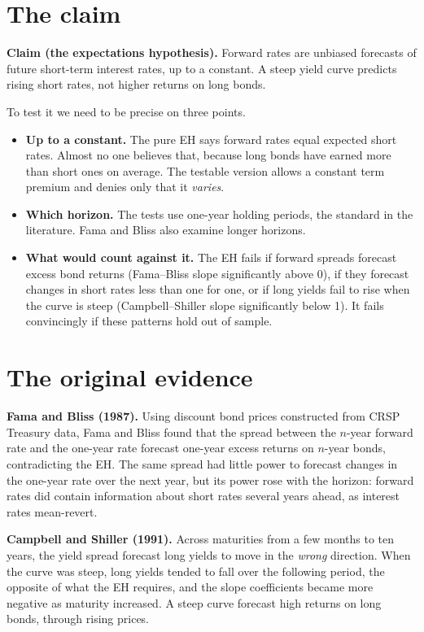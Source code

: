 \section{The claim}
\label{sec:16-claim}

\begin{callout}
\textbf{Claim (the expectations hypothesis).} Forward rates are unbiased forecasts of future short-term interest rates, up to a constant. A steep yield curve predicts rising short rates, not higher returns on long bonds.
\end{callout}

To test it we need to be precise on three points.

\begin{itemize}
  \item \textbf{Up to a constant.} The pure EH says forward rates equal expected short rates. Almost no one believes that, because long bonds have earned more than short ones on average. The testable version allows a constant term premium and denies only that it \emph{varies}.
  \item \textbf{Which horizon.} The tests use one-year holding periods, the standard in the literature. Fama and Bliss also examine longer horizons.
  \item \textbf{What would count against it.} The EH fails if forward spreads forecast excess bond returns (Fama--Bliss slope significantly above 0), if they forecast changes in short rates less than one for one, or if long yields fail to rise when the curve is steep (Campbell--Shiller slope significantly below 1). It fails convincingly if these patterns hold out of sample.
\end{itemize}

\section{The original evidence}
\label{sec:16-evidence}

\textbf{Fama and Bliss (1987).} Using discount bond prices constructed from CRSP Treasury data, Fama and Bliss found that the spread between the $n$-year forward rate and the one-year rate forecast one-year excess returns on $n$-year bonds, contradicting the EH. The same spread had little power to forecast changes in the one-year rate over the next year, but its power rose with the horizon: forward rates did contain information about short rates several years ahead, as interest rates mean-revert.

\textbf{Campbell and Shiller (1991).} Across maturities from a few months to ten years, the yield spread forecast long yields to move in the \emph{wrong} direction. When the curve was steep, long yields tended to fall over the following period, the opposite of what the EH requires, and the slope coefficients became more negative as maturity increased. A steep curve forecast high returns on long bonds, through rising prices.

